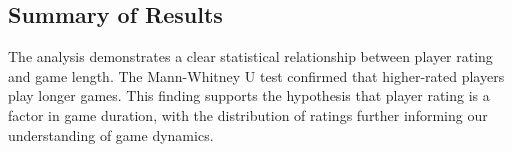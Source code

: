 \documentclass[conference]{IEEEtran}
\begin{document}
\subsection{Summary of Results}
The analysis demonstrates a clear statistical relationship between player rating and game length. The Mann-Whitney U test confirmed that higher-rated players play longer games. This finding supports the hypothesis that player rating is a factor in game duration, with the distribution of ratings further informing our understanding of game dynamics.



\newpage


\end{document}
